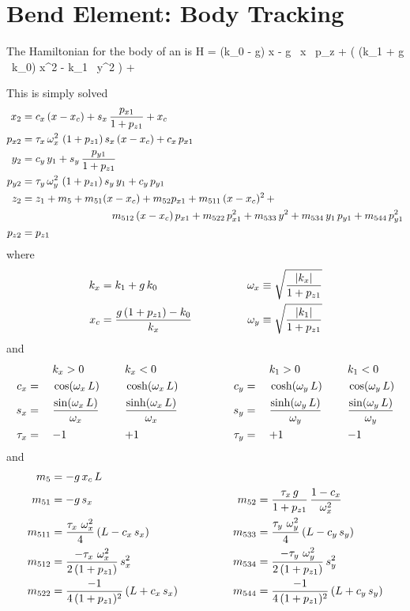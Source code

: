 \section{Bend Element: Body Tracking}
\label{s:bend.body.std}

The Hamiltonian for the body of an  is
\Begineq
  H = (k_0 - g) x - g \, x \, p_z + 
  \left( (k_1 + g \, k_0) x^2 - k_1 \, y^2 \right) +
\Endeq

This is simply solved
\begin{align}
  x_2    &= c_x \, (x - x_c) + s_x \, \frac{p_{x1}}{1 + p_{z1}} + x_c \CRNO
  p_{x2} &= \tau_x \, \om_x^2 \, \, (1 + p_{z1}) \, s_x \, (x -x_c) + c_x \, p_{x1} \CRNO
  y_2    &= c_y \, y_1 + s_y \, \frac{p_{y1}}{1 + p_{z1}} \CRNO
  p_{y2} &= \tau_y \, \om_y^2 \, \, (1 + p_{z1}) \, s_y \, y_1 + c_y \, p_{y1} \\
  z_2    &= z_1 + m_5 + m_{51} (x - x_c) + m_{52} p_{x1} + m_{511} \, (x-x_c)^2 \, + \CRNO
         &\hspace*{20ex} m_{512} \, (x-x_c) \, p_{x1} + m_{522} \, p_{x1}^2 + 
                         m_{533} \, y^2 + m_{534} \, y_1 \, p_{y1} + m_{544} \, p_{y1}^2 \CRNO
  p_{z2} &= p_{z1} \nonumber
\end{align}
where 
\begin{alignat}{2}
  k_x &= k_1 + g \, k_0 & \qquad \qquad
  \omega_x &\equiv \sqrt{\frac{|k_x|}{1 + p_{z1}}} \nonumber \\
  x_c &= \frac{g \, (1 + p_{z1}) - k_0}{k_x} & \qquad \qquad
  \omega_y &\equiv \sqrt{\frac{|k_1|}{1 + p_{z1}}} 
\end{alignat}
and
\begin{alignat}{6}
         &\hspace*{3ex}  && k_x > 0          &\hspace*{3ex}& k_x < 0 & \qquad \qquad
         &\hspace*{3ex}  && k_1 > 0          &\hspace*{3ex}& k_1 < 0 \nonumber \\
     c_x &=   && \cos  (\omega_x \, L)               && \cosh (\omega_x \, L) & \qquad \qquad
     c_y &=   && \cosh (\omega_y \, L)               && \cos  (\omega_y \, L) \nonumber \\
     s_x &=   && \frac{\sin  (\omega_x \, L)}{\omega_x} && \frac{\sinh (\omega_x \, L)}{\omega_x} & \qquad \qquad
     s_y &=   && \frac{\sinh (\omega_y \, L)}{\omega_y} && \frac{\sin  (\omega_y \, L)}{\omega_y} \\
  \tau_x &=   && {-}1             && {+}1             & \qquad \qquad
  \tau_y &=   && {+}1             && {-}1             \nonumber
\end{alignat}
and
\begin{alignat}{2}
  m_5     &= -g \, x_c \, L & \qquad \qquad & \nonumber \\
  m_{51}  &= -g \, s_x & \qquad \qquad
  m_{52}  &= \frac{\tau_x \, g}{1 + p_{z1}} \, \frac{1 - c_x}{\omega_x^2} \nonumber \\
  m_{511} &= \frac{\tau_x \,\, \omega_x^2}{4} \, (L - c_x \, s_x) & \qquad \qquad
  m_{533} &= \frac{\tau_y \,\, \omega_y^2}{4} \, (L - c_y \, s_y) \nonumber \\
  m_{512} &= \frac{-\tau_x \,\, \omega_x^2}{2 \, (1 + p_{z1})} \, s_x^2 & \qquad \qquad
  m_{534} &= \frac{-\tau_y \,\, \omega_y^2}{2 \, (1 + p_{z1})} \, s_y^2 \nonumber \\
  m_{522} &= \frac{-1}{4 \, (1 + p_{z1})^2} \, (L + c_x \, s_x) & \qquad \qquad
  m_{544} &= \frac{-1}{4 \, (1 + p_{z1})^2} \, (L + c_y \, s_y) \nonumber
\end{alignat}

